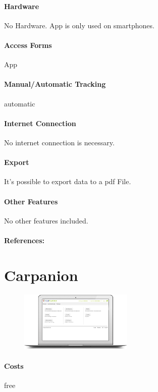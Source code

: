 \paragraph{Hardware} No Hardware. App is only used on smartphones.
\paragraph{Access Forms} App
\paragraph{Manual/Automatic Tracking} automatic
\paragraph{Internet Connection} No internet connection is necessary.
\paragraph{Export} It’s possible to export data to a \gls{pdf} File.
\paragraph{Other Features} No other features included.
\paragraph{References:} \cite{MyLog_GPS_Fahrtenbuch_Costs}
\newpage

\section{Carpanion}
\begin{figure}
  \begin{center}
    \includegraphics[width=0.48\textwidth]{bilder/Carpanion1}
  \end{center}
\end{figure}
\paragraph{Costs} free
